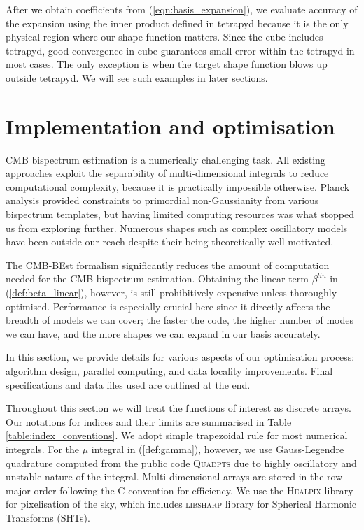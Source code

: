 After we obtain coefficients from (\ref{eqn:basis_expansion}), we evaluate accuracy of the expansion using the inner product defined in tetrapyd because it is the only physical region where our shape function matters. Since the cube includes tetrapyd, good convergence in cube guarantees small error within the tetrapyd in most cases. The only exception is when the target shape function blows up outside tetrapyd. We will see such examples in later sections.


\section{Implementation and optimisation} \label{section:implementation}

CMB bispectrum estimation is a numerically challenging task. All existing approaches exploit the separability of multi-dimensional integrals to reduce computational complexity, because it is practically impossible otherwise. Planck analysis provided constraints to primordial non-Gaussianity from various bispectrum templates, but having limited computing resources was what stopped us from exploring further. Numerous shapes such as complex oscillatory models have been outside our reach despite their being theoretically well-motivated.

The CMB-BEst formalism significantly reduces the amount of computation needed for the CMB bispectrum estimation. Obtaining the linear term $\beta^{lin}$ in (\ref{def:beta_linear}), however, is still prohibitively expensive unless thoroughly optimised. Performance is especially crucial here since it directly affects the breadth of models we can cover; the faster the code, the higher number of modes we can have, and the more shapes we can expand in our basis accurately.

In this section, we provide details for various aspects of our optimisation process: algorithm design, parallel computing, and data locality improvements. Final specifications and data files used are outlined at the end.

Throughout this section we will treat the functions of interest as discrete arrays. Our notations for indices and their limits are summarised in Table \ref{table:index_conventions}. We adopt simple trapezoidal rule for most numerical integrals. For the $\mu$ integral in (\ref{def:gamma}), however, we use Gauss-Legendre quadrature computed from the public code \textsc{Quadpts} \cite{Hale2013} due to highly oscillatory and unstable nature of the integral. Multi-dimensional arrays are stored in the row major order following the \textsc{C} convention for efficiency. We use the \textsc{Healpix} library \cite{Gorski2005healpix} for pixelisation of the sky, which includes \textsc{libsharp} \cite{Reinecke2013libsharp} library for Spherical Harmonic Transforms (SHTs).

